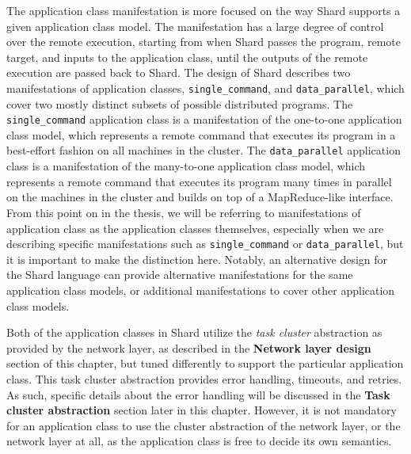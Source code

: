 \documentclass[twoside]{report}
\begin{document}
The application class manifestation is more focused on the way Shard supports a given application class model.
The manifestation has a large degree of control over the remote execution, starting from when Shard passes the program, remote target, and inputs to the application class, until the outputs of the remote execution are passed back to Shard.
The design of Shard describes two manifestations of application classes, \texttt{single\_command}, and \texttt{data\_parallel}, which cover two mostly distinct subsets of possible distributed programs.
The \texttt{single\_command} application class is a manifestation of the one-to-one application class model, which represents a remote command that executes its program in a best-effort fashion on all machines in the cluster.
The \texttt{data\_parallel} application class is a manifestation of the many-to-one application class model, which represents a remote command that executes its program many times in parallel on the machines in the cluster and builds on top of a MapReduce-like interface.
From this point on in the thesis, we will be referring to manifestations of application class as the application classes themselves, especially when we are describing specific manifestations such as \texttt{single\_command} or \texttt{data\_parallel}, but it is important to make the distinction here.
Notably, an alternative design for the Shard language can provide alternative manifestations for the same application class models, or additional manifestations to cover other application class models.


Both of the application classes in Shard utilize the \textit{task cluster} abstraction as provided by the network layer, as described in the \textbf{Network layer design} section of this chapter, but tuned differently to support the particular application class.
This task cluster abstraction provides error handling, timeouts, and retries.
As such, specific details about the error handling will be discussed in the \textbf{Task cluster abstraction} section later in this chapter.
However, it is not mandatory for an application class to use the cluster abstraction of the network layer, or the network layer at all, as the application class is free to decide its own semantics.
\end{document}

